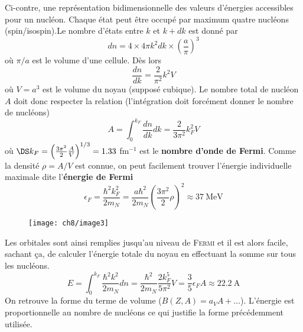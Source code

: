 Ci-contre, une représentation bidimensionnelle des valeurs d'énergies accessibles pour un nucléon. Chaque état
peut être occupé par maximum quatre nucléons (spin/isospin).Le nombre d'états entre $k$ et $k+dk$ est donné par
\begin{equation}
dn = 4\times 4\pi k^2dk\times\left(\frac{a}{\pi}\right)^3
\end{equation}
où $\pi/a$ est le volume d'une cellule. Dès lors
\begin{equation}
\frac{dn}{dk} = \frac{2}{\pi^2}k^2V
\end{equation}
où $V=a^3$ est le volume du noyau (supposé cubique). Le nombre total de nucléon $A$ doit donc respecter la
relation (l'intégration doit forcément donner le nombre de nucléons)
\begin{equation}
A = \int_0^{k_F} \frac{dn}{dk}dk = \frac{2}{3\pi^2}k_F^2V
\end{equation}
où $\DS k_F = \left(\frac{3\pi^2}{2}\frac{A}{V}\right)^{1/3} = 1.33$ fm$^{-1}$ est le \textbf{nombre d'onde de
Fermi}. Comme la densité $\rho = A/V$ est connue, on peut facilement trouver l'énergie individuelle maximale
dite l'\textbf{énergie de Fermi}
\begin{equation}
\epsilon_F = \frac{\hbar^2k_F^2}{2m_N}=\frac{a\hbar^2}{2m_N}\left(\frac{3\pi^2}{2}\rho\right)^2 \approx
37\ \text{MeV}
\end{equation}


	\begin{wrapfigure}[8]{l}{7.5cm}
	\vspace{-5mm}
	\texttt{[image: ch8/image3]}
	\end{wrapfigure}
	

Les orbitales sont ainsi remplies jusqu'au niveau de \textsc{Fermi} et il est alors facile, sachant ça, de 
calculer l'énergie totale du noyau en effectuant la somme sur tous les nucléons. 
\begin{equation}
E = \int_0^{k_F} \frac{\hbar^2k^2}{2m_N}dn = \frac{\hbar^2}{2m_N}\frac{2k_F^5}{5\pi^2}V = \frac{3}{5}\epsilon_F
A \approx 22.2\ \text{A}
\end{equation}
On retrouve la forme du terme de volume ($B(Z,A) = a_VA+\dots$). L'énergie est proportionnelle au nombre 
de nucléons ce qui justifie la forme précédemment utilisée.\\




